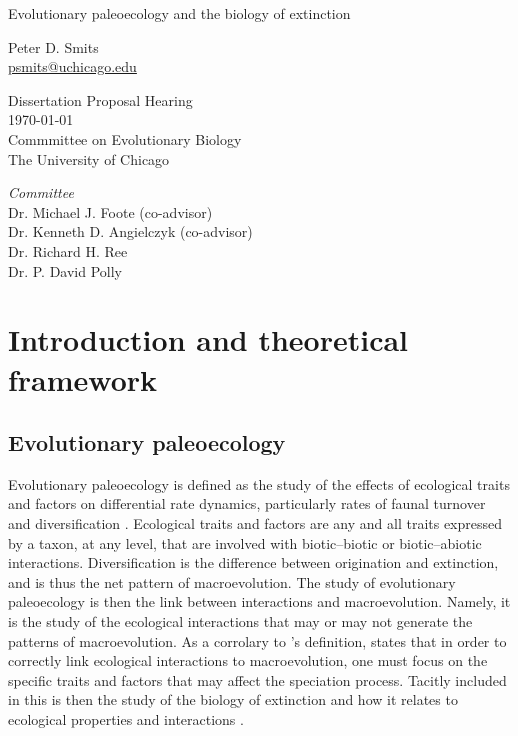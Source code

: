 \documentclass[12pt,letterpaper]{article}
\begin{document}
\setcounter{secnumdepth}{0}

\begin{titlepage}
  \begin{center}
    \huge{Evolutionary paleoecology and the biology of extinction}

    \vspace{1.5cm}

    \large{Peter D. Smits \\}
    \footnotesize{\href{mailto:psmits@uchicago.edu}{psmits@uchicago.edu}}

    \vspace{1.5cm}

    Dissertation Proposal Hearing \\
    \today \\
    Commmittee on Evolutionary Biology \\
    The University of Chicago

    \vspace{1.5cm}

    \textit{Committee} \\
    Dr. Michael J. Foote (co-advisor) \\
    Dr. Kenneth D. Angielczyk (co-advisor) \\
    Dr. Richard H. Ree \\
    Dr. P. David Polly
  \end{center}
\end{titlepage}

\linenumbers
\modulolinenumbers[2]


\section{Introduction and theoretical framework}

\subsection{Evolutionary paleoecology}
Evolutionary paleoecology is defined as the study of the effects of ecological traits and factors on differential rate dynamics, particularly rates of faunal turnover and diversification \citep{Kitchell1985a}. Ecological traits and factors are any and all traits expressed by a taxon, at any level, that are involved with biotic--biotic or biotic--abiotic interactions. Diversification is the difference between origination and extinction, and is thus the net pattern of macroevolution. The study of evolutionary paleoecology is then the link between interactions and macroevolution. Namely, it is the study of the ecological interactions that  may or may not generate the patterns of macroevolution. As a corrolary to \citet{Kitchell1985a}'s definition, \citet{Allmon1994} states that in order to correctly link ecological interactions to macroevolution, one must focus on the specific traits and factors that may affect the speciation process. Tacitly included in this is then the study of the biology of extinction and how it relates to ecological properties and interactions \citep{Kitchell1990}.
\end{document}
